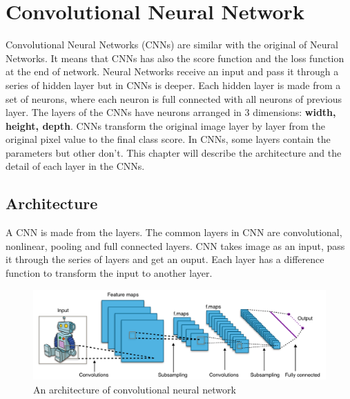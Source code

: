 \chapter{Convolutional Neural Network}
Convolutional Neural Networks (CNNs) are similar with the original of Neural Networks. It means that CNNs has also the score function and the loss function at the end of network. Neural Networks receive an input and pass it through a series of hidden layer but in CNNs is deeper. Each hidden layer is made from a set of neurons, where each neuron is full connected with all neurons of previous layer. The layers of the CNNs have neurons arranged in 3 dimensions: \textbf{width, height, depth}. CNNs transform the original image layer by layer from the original pixel value to the final class score. In CNNs, some layers contain the parameters but other don't. This chapter will describe the architecture and the detail of each layer in the CNNs.
\section{Architecture}
A CNN is made from the layers. The common layers in CNN are convolutional, nonlinear, pooling and full connected layers. CNN takes image as an input, pass it through the series of layers and get an ouput. Each layer has a difference function to transform the input to another layer. 
\begin{figure}[h]
	\centering
	\includegraphics[scale=0.45]{images/cnn_architecture}
	\caption{An architecture of convolutional neural network}
	\label{figlncex}
\end{figure}~\\
